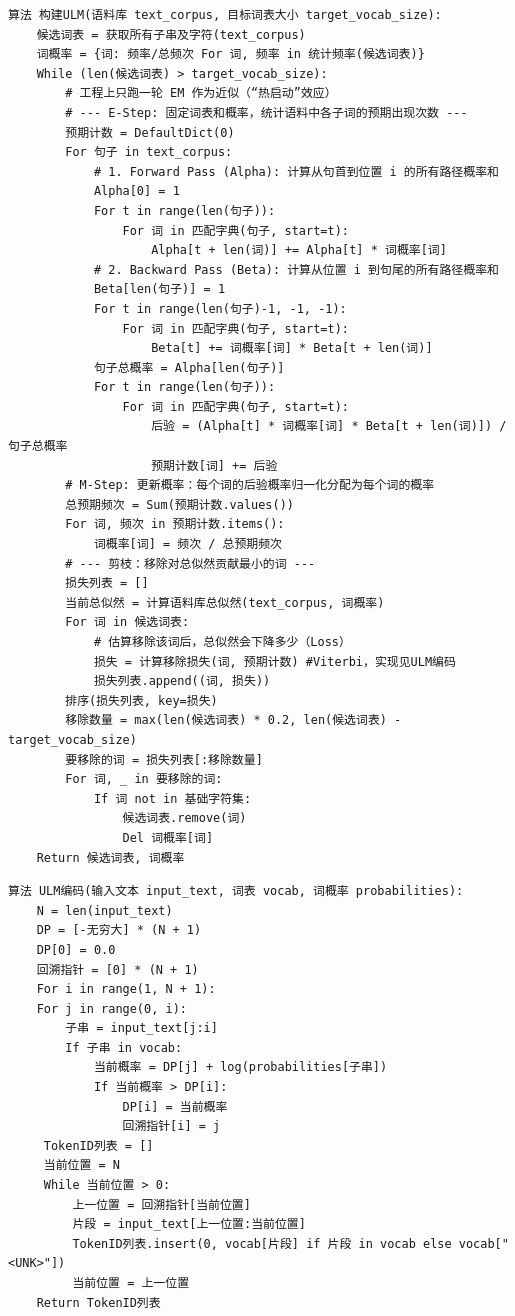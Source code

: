 \documentclass[11pt, a4paper]{article}
\begin{document}
\begin{lstlisting}[caption={构建 ULM}]
算法 构建ULM(语料库 text_corpus, 目标词表大小 target_vocab_size):
    候选词表 = 获取所有子串及字符(text_corpus)
    词概率 = {词: 频率/总频次 For 词, 频率 in 统计频率(候选词表)}
    While (len(候选词表) > target_vocab_size):
        # 工程上只跑一轮 EM 作为近似（“热启动”效应）
        # --- E-Step: 固定词表和概率，统计语料中各子词的预期出现次数 ---
        预期计数 = DefaultDict(0)
        For 句子 in text_corpus:
            # 1. Forward Pass (Alpha): 计算从句首到位置 i 的所有路径概率和
            Alpha[0] = 1
            For t in range(len(句子)):
                For 词 in 匹配字典(句子, start=t):
                    Alpha[t + len(词)] += Alpha[t] * 词概率[词]
            # 2. Backward Pass (Beta): 计算从位置 i 到句尾的所有路径概率和
            Beta[len(句子)] = 1
            For t in range(len(句子)-1, -1, -1):
                For 词 in 匹配字典(句子, start=t):
                    Beta[t] += 词概率[词] * Beta[t + len(词)]
            句子总概率 = Alpha[len(句子)]
            For t in range(len(句子)):
                For 词 in 匹配字典(句子, start=t):
                    后验 = (Alpha[t] * 词概率[词] * Beta[t + len(词)]) / 句子总概率
                    预期计数[词] += 后验
        # M-Step: 更新概率：每个词的后验概率归一化分配为每个词的概率
        总预期频次 = Sum(预期计数.values())
        For 词, 频次 in 预期计数.items():
            词概率[词] = 频次 / 总预期频次
        # --- 剪枝：移除对总似然贡献最小的词 ---
        损失列表 = []
        当前总似然 = 计算语料库总似然(text_corpus, 词概率)
        For 词 in 候选词表:
            # 估算移除该词后，总似然会下降多少（Loss）
            损失 = 计算移除损失(词, 预期计数) #Viterbi，实现见ULM编码
            损失列表.append((词, 损失))
        排序(损失列表, key=损失)
        移除数量 = max(len(候选词表) * 0.2, len(候选词表) - target_vocab_size)
        要移除的词 = 损失列表[:移除数量]
        For 词, _ in 要移除的词:
            If 词 not in 基础字符集:
                候选词表.remove(词)
                Del 词概率[词]
    Return 候选词表, 词概率
\end{lstlisting}

\begin{lstlisting}[caption={ULM 编码 (Viterbi)}]
算法 ULM编码(输入文本 input_text, 词表 vocab, 词概率 probabilities):
    N = len(input_text)
    DP = [-无穷大] * (N + 1)
    DP[0] = 0.0
    回溯指针 = [0] * (N + 1)
    For i in range(1, N + 1):
    For j in range(0, i):
        子串 = input_text[j:i]
        If 子串 in vocab:
            当前概率 = DP[j] + log(probabilities[子串])
            If 当前概率 > DP[i]:
                DP[i] = 当前概率
                回溯指针[i] = j
     TokenID列表 = []
     当前位置 = N
     While 当前位置 > 0:
         上一位置 = 回溯指针[当前位置]
         片段 = input_text[上一位置:当前位置]
         TokenID列表.insert(0, vocab[片段] if 片段 in vocab else vocab["<UNK>"])
         当前位置 = 上一位置
    Return TokenID列表
\end{lstlisting}
\end{document}

